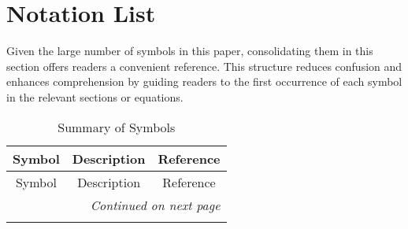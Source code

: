 \section{Notation List}
Given the large number of symbols in this paper, consolidating them in this section offers readers a convenient reference. This structure reduces confusion and enhances comprehension by guiding readers to the first occurrence of each symbol in the relevant sections or equations.

\begin{longtable}{@{}ccc@{}}
    \toprule
    Symbol       & Description                           & Reference \\ \midrule
    \endfirsthead
    
    \toprule
    Symbol       & Description                           & Reference \\ \midrule
    \endhead
    
    \midrule
    \multicolumn{3}{r}{\textit{Continued on next page}} \\ 
    \endfoot
    
    \bottomrule
    \caption{Summary of Symbols}
    \endlastfoot


\end{longtable}
